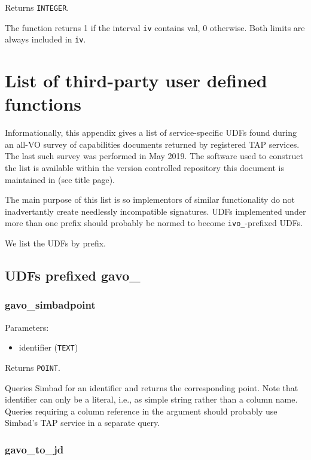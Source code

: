 \documentclass[11pt,a4paper]{ivoa}
\begin{document}
Returns \texttt{INTEGER}.

The function returns 1 if the interval \texttt{iv} contains val, 0
otherwise. Both  limits are always included in \texttt{iv}.


\appendix

\section{List of third-party user defined functions}

Informationally, this appendix gives a list of service-specific UDFs
found during an all-VO survey of capabilities documents returned by
registered TAP services.  The last such survey was performed in May
2019.  The software used to construct the list is available within the
version controlled repository this document is maintained in (see title
page).

The main purpose of this list is so implementors of similar
functionality do not inadvertantly create needlessly incompatible
signatures.  UDFs implemented under more than one prefix should probably
be normed to become \verb|ivo_|-prefixed UDFs.

We list the UDFs by prefix.

\subsection{UDFs prefixed gavo\_}

\subsubsection{gavo\_simbadpoint}

Parameters:

\begin{itemize}
	\item identifier (\texttt{TEXT})
\end{itemize}

Returns \texttt{POINT}.

Queries Simbad for an identifier and returns the corresponding point.
Note that identifier can only be a literal, i.e., as simple string
rather than a column name.  Queries requiring a column reference in the
argument should probably use Simbad's TAP service in a separate query.

\subsubsection{gavo\_to\_jd}
\end{document}
